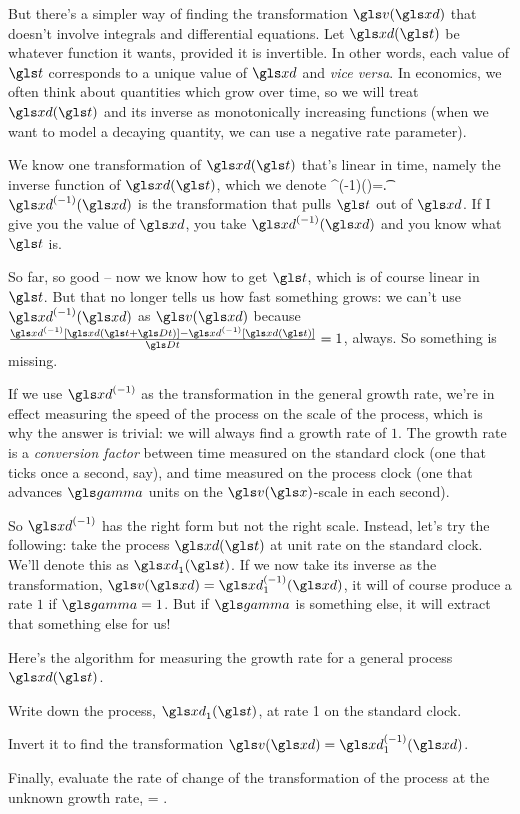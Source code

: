 But there's a simpler way of finding the transformation $\gv(\xd)$ that doesn't involve integrals and differential equations. Let $\xd(\t)$ be whatever function it wants, provided it is invertible. In other words, each value of $\t$ corresponds to a unique value of $\xd$ and \textit{vice versa}. In economics, we often think about quantities which grow over time, so we will treat $\xd(\t)$ and its inverse as monotonically increasing functions (when we want to model a decaying quantity, we can use a negative rate parameter).

We know one transformation of $\xd(\t)$ that's linear in time, namely the inverse function of $\xd(\t)$, which we denote 
\be
\xd^{(-1)}(\xd)=\t.
\ee
$\xd^{(-1)}(\xd)$ is the transformation that pulls $\t$ out of $\xd$. If I give you the value of $\xd$, you take  $\xd^{(-1)}(\xd)$ and you know what $\t$ is.

So far, so good -- now we know how to get $\t$, which is of course linear in $\t$. But that no longer tells 
us how fast something grows: we can't use $\xd^{(-1)}(\xd)$ as $\gv(\xd)$ because 
$\frac{\xd^{(-1)}[\xd(\t+\Dt)]-\xd^{(-1)}[\xd(\t)]}{\Dt}=1$, always. So something is missing.

If we use $\xd^{(-1)}$ as the transformation in the general growth rate, we're in effect measuring the 
speed of the process on the scale of the process, which is why the answer is trivial: we will always 
find a growth rate of $1$.  The growth rate is a {\it conversion factor} between time measured on 
the standard clock (one that ticks once a second, say), and time measured on the process clock 
(one that advances $\ggamma$ units on the $\gv(\x)$-scale in each second). 

So $\xd^{(-1)}$ has the right form but not the right scale. Instead, let's try the following: take the process 
$\xd(\t)$ at unit rate on the standard clock. We'll denote this as $\xd_1(\t)$. If we now take its inverse as 
the transformation,  $\gv(\xd)=\xd_1^{(-1)}(\xd)$, it will of course produce a rate $1$ if $\ggamma=1$. 
But if $\ggamma$ is something else, it will extract that something else for us!

Here's the algorithm for measuring the growth rate for a general process $\xd(\t)$.
\bi
\item
Write down the process, $\xd_1(\t)$, at rate 1 on the standard clock.
\item
Invert it to find the transformation $\gv(\xd) = \xd_1^{(-1)}(\xd)$.
\item
Finally, evaluate the rate of change of the transformation of the process at the unknown growth rate, 
\be
\g = \frac{\gv(\xd(\t+\Dt)) - \gv(\xd(\t))}{\Dt}.
\ee
\ei

